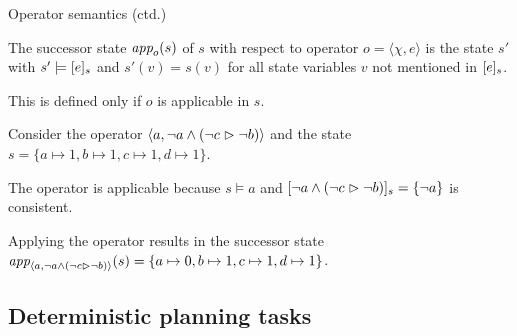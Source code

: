\documentclass{gkibeamer}
\begin{document}
\begin{frame}{Operator semantics (ctd.)}
  \begin{definition}
    The \alert{successor state} $\textit{app}_{o}(s)$ of $s$ with respect
    to operator $o = \langle \chi,e\rangle$ is the state $s'$ with $s'
    \models \lbrack e\rbrack_{s}$ and $s'(v) = s(v)$ for all state variables
    $v$ not mentioned in $\lbrack e\rbrack_{s}$.
    
    This is defined only if $o$ is applicable in $s$.
  \end{definition}

  \begin{example}
    Consider the operator
    $\langle a, \neg a \land (\neg c \vartriangleright \neg b)\rangle$ 
    and the state $s = \{a \mapsto 1, b \mapsto 1, c \mapsto 1, d
      \mapsto 1\}$.

    The operator is applicable because $s \models a$ and $\lbrack \neg
      a \land (\neg c \vartriangleright \neg b)\rbrack_{s} = \{\neg a\}$ is consistent.
      
    Applying the operator results in the successor state
    $\textit{app}_{\langle a, \neg a \land (\neg c \vartriangleright \neg b)
      \rangle}(s) = \{a \mapsto 0, b \mapsto 1, c \mapsto 1, d \mapsto
      1\}$.
  \end{example}
\end{frame}

\subsection[Tasks]{Deterministic planning tasks}
\end{document}
